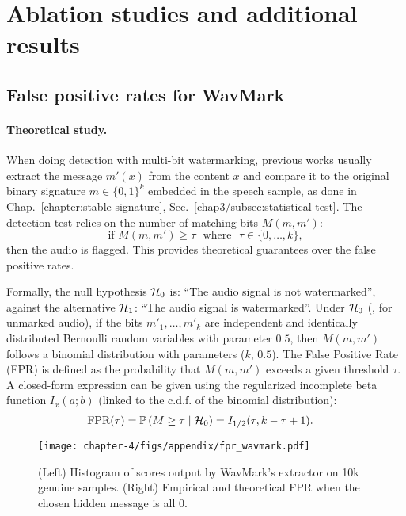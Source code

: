 


\section{Ablation studies and additional results}\label{chap4/sec:ablations}






\subsection{False positive rates for WavMark}\label{chap4/app:fpr}

\paragraph{Theoretical study.}

When doing detection with multi-bit watermarking, previous works usually extract the message $m'(x)$ from the content $x$ and compare it to the original binary signature $m\in \{ 0,1 \}^{k}$ embedded in the speech sample, as done in Chap.~\ref{chapter:stable-signature}, Sec.~\ref{chap3/subsec:statistical-test}.
The detection test relies on the number of matching bits $M(m,m')$:
\begin{equation} 
    \text{if } M\left(m,m'\right) \geq \tau \,\,\textrm{ where }\,\, \tau\in 
\{0,\ldots,k\},
\end{equation}
then the audio is flagged.
This provides theoretical guarantees over the false positive rates.

Formally, the null hypothesis $\mathcal{H}_0$ is: ``The audio signal is not watermarked'', against the alternative $\mathcal{H}_1$: ``The audio signal is watermarked''.
Under $\mathcal{H}_0$ (\ie, for unmarked audio), if the bits $m'_1, \ldots, m'_k$ are independent and identically distributed Bernoulli random variables with parameter $0.5$, then  $M(m, m')$ follows a binomial distribution with parameters ($k$, $0.5$).
The False Positive Rate (FPR) is defined as the probability that $M(m, m')$ exceeds a given threshold $\tau$. 
A closed-form expression can be given using the regularized incomplete beta function $I_x(a;b)$ (linked to the c.d.f. of the binomial distribution):
\begin{align}\label{chap4/eq:p-value}
    \text{FPR}(\tau) & = \mathbb{P}\left(M \geq \tau \mid \mathcal{H}_0\right) = I_{1/2}(\tau, k - \tau +1).
\end{align}


\begin{figure}[b!]
    \centering
    \texttt{[image: chapter-4/figs/appendix/fpr\_wavmark.pdf]}
    \caption{
        (Left) Histogram of scores output by WavMark's extractor on 10k genuine samples. 
        (Right) Empirical and theoretical FPR when the chosen hidden message is all 0.
    }
    \label{chap4/fig:app_fpr_wavmark}
\end{figure}

